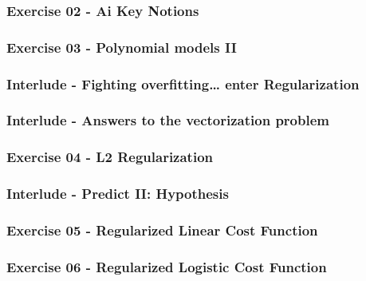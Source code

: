 \documentclass[]{article}
\begin{document}
\hypertarget{exercise-02---ai-key-notions}{%
\subsubsection{Exercise 02 - Ai Key
Notions}\label{exercise-02---ai-key-notions}}

\hypertarget{exercise-03---polynomial-models-ii}{%
\subsubsection{Exercise 03 - Polynomial models
II}\label{exercise-03---polynomial-models-ii}}

\hypertarget{interlude---fighting-overfitting-enter-regularization}{%
\subsubsection{Interlude - Fighting overfitting\ldots{} enter
Regularization}\label{interlude---fighting-overfitting-enter-regularization}}

\hypertarget{interlude---answers-to-the-vectorization-problem}{%
\subsubsection{Interlude - Answers to the vectorization
problem}\label{interlude---answers-to-the-vectorization-problem}}

\hypertarget{exercise-04---l2-regularization}{%
\subsubsection{Exercise 04 - L2
Regularization}\label{exercise-04---l2-regularization}}

\hypertarget{interlude---predict-ii-hypothesis}{%
\subsubsection{Interlude - Predict II:
Hypothesis}\label{interlude---predict-ii-hypothesis}}

\hypertarget{exercise-05---regularized-linear-cost-function}{%
\subsubsection{Exercise 05 - Regularized Linear Cost
Function}\label{exercise-05---regularized-linear-cost-function}}

\hypertarget{exercise-06---regularized-logistic-cost-function}{%
\subsubsection{Exercise 06 - Regularized Logistic Cost
Function}\label{exercise-06---regularized-logistic-cost-function}}
\end{document}
